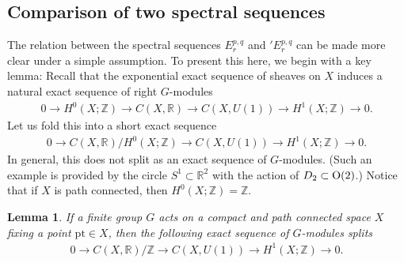 \documentclass[pdftex]{sigma}
\newtheorem{lem}[thm]{Lemma}
\theoremstyle{definition}
\newcommand{\R}{\mathbb{R}}
\newcommand{\Z}{\mathbb{Z}}
\newcommand{\pt}{\mathrm{pt}}
\begin{document}
\subsection{Comparison of two spectral sequences}\label{subsec:comparison}

The relation between the spectral sequences $E_r^{p, q}$ and ${}'E_r^{p, q}$ can be made more clear under a simple assumption. To present this here, we begin with a key lemma: Recall that the exponential exact sequence of sheaves on $X$ induces a natural exact sequence of right $G$-modules
\begin{gather*}
0 \to H^0(X; \Z) \to C(X, \R) \to C(X, U(1)) \to H^1(X; \Z) \to 0.
\end{gather*}
Let us fold this into a short exact sequence
\begin{gather*}
0 \to C(X, \R)/H^0(X; \Z) \to C(X, U(1)) \to H^1(X; \Z) \to 0.
\end{gather*}
In general, this does not split as an exact sequence of $G$-modules. (Such an example is provided by the circle $S^1 \subset \R^2$ with the action of $D_2 \subset {\rm O}(2)$.) Notice that if $X$ is path connected, then $H^0(X; \Z) = \Z$.

\begin{lem} \label{lem:splitting}
If a finite group $G$ acts on a compact and path connected space $X$ fixing a point $\pt \in X$, then the following exact sequence of $G$-modules splits
\begin{gather*}
0 \to C(X, \R)/\Z \to C(X, U(1)) \to H^1(X; \Z) \to 0.
\end{gather*}
\end{lem}
\end{document}
